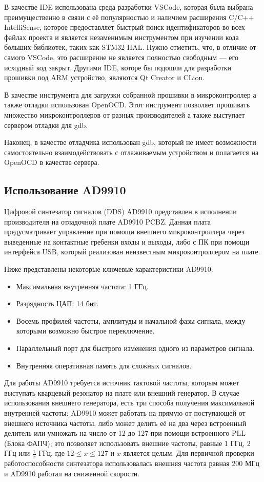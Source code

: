 \documentclass[rusmathsym, eqnumwithinsec, amspack, hyperref]{bomgost}
\begin{document}
В качестве IDE использована среда разработки VSCode, которая была выбрана преимущественно в связи с её популярностью и наличием расширения C/C++ IntelliSense, которое предоставляет быстрый поиск идентификаторов во всех файлах проекта и является незаменимым инструментом при изучении кода больших библиотек, таких как STM32 HAL. Нужно отметить, что, в отличие от самого VSCode, это расширение не является полностью свободным — его исходный код закрыт. Другими IDE, которе бы подошли для разработки прошивки под ARM устройство, являются Qt Creator и CLion.

В качестве инструмента для загрузки собранной прошивки в микроконтроллер а также отладки использован OpenOCD. Этот инструмент позволяет прошивать множество микроконтроллеров от разных производителей а также выступает сервером отладки для gdb.

Наконец, в качестве отладчика использован gdb, который не имеет возможности самостоятельно взаимодействовать с отлаживаемым устройством и полагается на OpenOCD в качестве сервера.

\subsection{Использование AD9910}

Цифровой синтезатор сигналов (DDS) AD9910 представлен в исполнении производителя на отладочной плате AD9910 PCBZ. Данная плата предусматривает управление при помощи внешнего микроконтроллера через выведенные на контактные гребенки входы и выходы, либо с ПК при помощи интерфейса USB, который реализован неизвестным микроконтроллером на плате.

Ниже представлены некоторые ключевые характеристики AD9910:

\begin{itemize}
	\item Максимальная внутренняя частота: 1 ГГц.
	\item Разрядность ЦАП: 14 бит.
	\item Восемь профилей частоты, амплитуды и начальной фазы сигнала, между которыми возможно быстрое переключение.
	\item Параллельный порт для быстрого изменения одного из параметров сигнала.
	\item Внутренняя оперативная память для сложных сигналов.
\end{itemize}

Для работы AD9910 требуется источник тактовой частоты, которым может выступать кварцевый резонатор на плате или внешний генератор. В случае использования внешнего генератора, есть три способа получения максимальной внутренней частоты: AD9910 может работать на прямую от поступающей от внешнего источника частоты, либо может делить её на два через встроенный делитель или умножать на число от 12 до 127 при помощи встроенного PLL (Блока ФАПЧ); это позволяет использовать внешние частоты, равные 1 ГГц, 2 ГГц или $\frac{1}{x}$ ГГц, где $12 \leq x \leq 127$ и $x$ является целым. Для первичной проверки работоспособности синтезатора использовалась внешняя частота равная 200 МГц и AD9910 работал на сниженной скорости.
\end{document}
